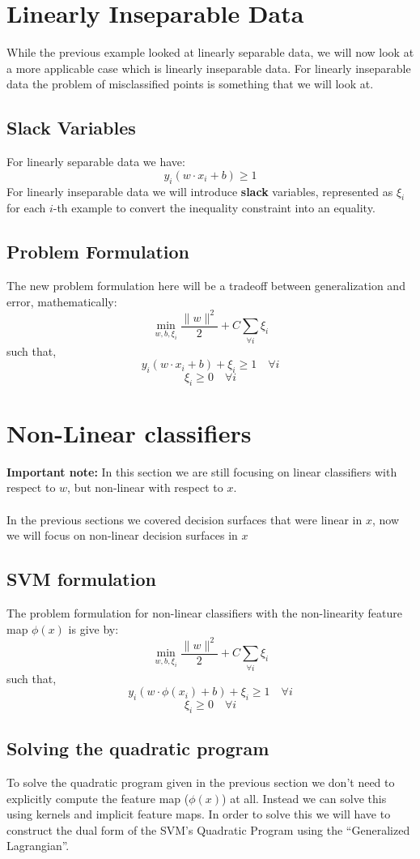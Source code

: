\documentclass[12pt, a4paper]{book}
\begin{document}
\section{Linearly Inseparable Data}
While the previous example looked at linearly separable data, we will now look at a more applicable case which is linearly inseparable data. For linearly inseparable data the problem of misclassified points is something that we will look at.

\subsection{Slack Variables}
For linearly separable data we have:
$$y_i(w\cdot x_i +b) \geq 1$$
For linearly inseparable data we will introduce \textbf{slack} variables, represented as $\xi_i$ for each $i$-th example to convert the inequality constraint into an equality.

\subsection{Problem Formulation}
The new problem formulation here will be a tradeoff between generalization and error, mathematically:
$$\min_{w,b,\xi_i}\frac{\|w\|^2}{2} + C\sum_{\forall i}\xi_i$$
such that,
$$y_i(w\cdot x_i +b) + \xi_i \geq 1 \quad \forall i$$
$$\xi_i \geq 0 \quad \forall i$$


\section{Non-Linear classifiers}
\textbf{Important note:} In this section we are still focusing on linear classifiers with respect to $w$, but non-linear with respect to $x$.\\\\
In the previous sections we covered decision surfaces that were linear in $x$, now we will focus on non-linear decision surfaces in $x$

\subsection{SVM formulation}
The problem formulation for non-linear classifiers with the non-linearity feature map $\phi(x)$ is give by:
$$\min_{w,b,\xi_i}\frac{\|w\|^2}{2} + C\sum_{\forall i}\xi_i$$
such that,
$$y_i(w\cdot \phi(x_i) +b) + \xi_i \geq 1 \quad \forall i$$
$$\xi_i \geq 0 \quad \forall i$$

\subsection{Solving the quadratic program}
To solve the quadratic program given  in the previous section we don't need to explicitly compute the feature map ($\phi(x)$) at all. Instead we can solve this using kernels and implicit feature maps. In order to solve this we will have to construct the dual form of the SVM’s Quadratic Program using the “Generalized Lagrangian”.
\end{document}
